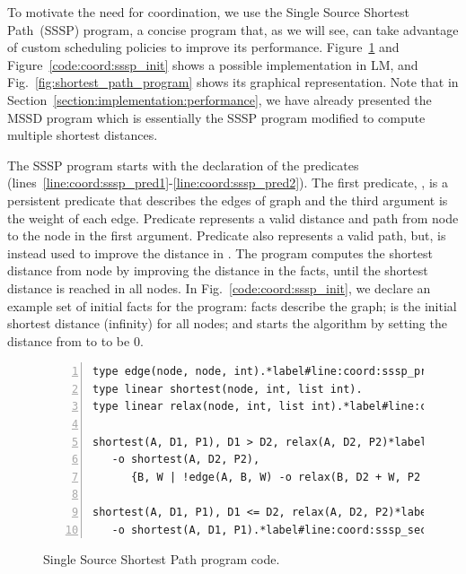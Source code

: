 To motivate the need for coordination, we use the Single Source Shortest
Path~(SSSP) program, a concise program that, as we will see, can take advantage
of custom scheduling policies to improve its performance.
Figure~\ref{code:shortest_path_program} and Figure~\ref{code:coord:sssp_init}
shows a possible implementation in LM, and Fig.~\ref{fig:shortest_path_program}
shows its graphical representation. Note that in
Section~\ref{section:implementation:performance}, we have already presented the
MSSD program which is essentially the SSSP program modified to compute multiple
shortest distances.

The SSSP program starts with the declaration of the predicates~
(lines~\ref{line:coord:sssp_pred1}-\ref{line:coord:sssp_pred2}). The first
predicate, , is a persistent predicate that describes the edges of
graph and the third argument is the weight of each edge. Predicate
 represents a valid distance and path from node  to the
node in the first argument. Predicate  also represents a valid path,
but, is instead used to improve the distance in .  The program
computes the shortest distance from node  by improving the distance in
the  facts, until the shortest distance is reached in all nodes.
In Fig.~\ref{code:coord:sssp_init}, we declare an example set of initial facts
for the program:  facts describe the graph;  is the initial shortest distance (infinity) for all nodes; and
 starts the algorithm by setting the distance from
 to  to be 0.

\begin{figure}[ht]
\begin{Verbatim}[numbers=left,fontsize=\codesize,commandchars=\*\#\&]
type edge(node, node, int).*label#line:coord:sssp_pred1&*hfill// Predicate declaration
type linear shortest(node, int, list int).
type linear relax(node, int, list int).*label#line:coord:sssp_pred2&

shortest(A, D1, P1), D1 > D2, relax(A, D2, P2)*label#line:coord:sssp_first1&*hfill// Rule 1: newly improved path
   -o shortest(A, D2, P2),
      {B, W | !edge(A, B, W) -o relax(B, D2 + W, P2 ++ [B])}.*label#line:coord:sssp_first2&

shortest(A, D1, P1), D1 <= D2, relax(A, D2, P2)*label#line:coord:sssp_second1&*hfill// Rule 2: longer path
   -o shortest(A, D1, P1).*label#line:coord:sssp_second2&
\end{Verbatim}
\caption{Single Source Shortest Path program code.}
\label{code:shortest_path_program}
\end{figure}

